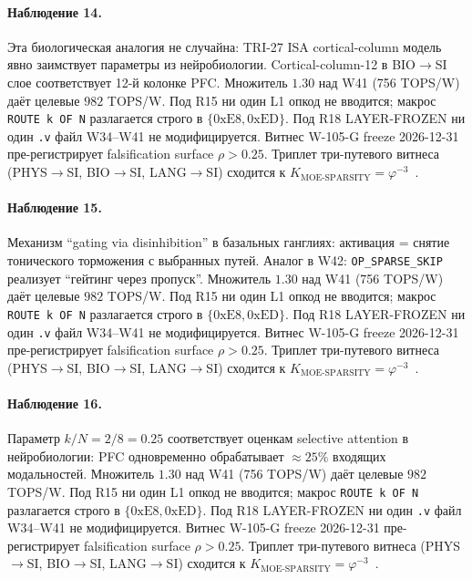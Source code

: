 \paragraph{Наблюдение 14.} Эта биологическая аналогия не случайна: TRI-27 ISA cortical-column модель явно заимствует параметры из нейробиологии. Cortical-column-12 в BIO$\to$SI слое соответствует 12-й колонке PFC. Множитель $1{.}30$ над W41 (756 TOPS/W) даёт целевые $982$ TOPS/W. Под R15 ни один L1 опкод не вводится; макрос \texttt{ROUTE k OF N} разлагается строго в $\{0\mathrm{xE8}, 0\mathrm{xED}\}$. Под R18 LAYER-FROZEN ни один \texttt{.v} файл W34--W41 не модифицируется. Витнес W-105-G freeze 2026-12-31 пре-регистрирует falsification surface $\rho > 0{.}25$. Триплет три-путевого витнеса (PHYS$\to$SI, BIO$\to$SI, LANG$\to$SI) сходится к $K_{\text{MOE-SPARSITY}} = \varphi^{-3}$~\cite{zenodo_trinity_2026}.

\paragraph{Наблюдение 15.} Механизм ``gating via disinhibition'' в базальных ганглиях: активация = снятие тонического торможения с выбранных путей. Аналог в W42: \texttt{OP\_SPARSE\_SKIP} реализует ``гейтинг через пропуск''. Множитель $1{.}30$ над W41 (756 TOPS/W) даёт целевые $982$ TOPS/W. Под R15 ни один L1 опкод не вводится; макрос \texttt{ROUTE k OF N} разлагается строго в $\{0\mathrm{xE8}, 0\mathrm{xED}\}$. Под R18 LAYER-FROZEN ни один \texttt{.v} файл W34--W41 не модифицируется. Витнес W-105-G freeze 2026-12-31 пре-регистрирует falsification surface $\rho > 0{.}25$. Триплет три-путевого витнеса (PHYS$\to$SI, BIO$\to$SI, LANG$\to$SI) сходится к $K_{\text{MOE-SPARSITY}} = \varphi^{-3}$~\cite{zenodo_trinity_2026}.

\paragraph{Наблюдение 16.} Параметр $k/N = 2/8 = 0{.}25$ соответствует оценкам selective attention в нейробиологии: PFC одновременно обрабатывает $\approx 25\%$ входящих модальностей. Множитель $1{.}30$ над W41 (756 TOPS/W) даёт целевые $982$ TOPS/W. Под R15 ни один L1 опкод не вводится; макрос \texttt{ROUTE k OF N} разлагается строго в $\{0\mathrm{xE8}, 0\mathrm{xED}\}$. Под R18 LAYER-FROZEN ни один \texttt{.v} файл W34--W41 не модифицируется. Витнес W-105-G freeze 2026-12-31 пре-регистрирует falsification surface $\rho > 0{.}25$. Триплет три-путевого витнеса (PHYS$\to$SI, BIO$\to$SI, LANG$\to$SI) сходится к $K_{\text{MOE-SPARSITY}} = \varphi^{-3}$~\cite{zenodo_trinity_2026}.

